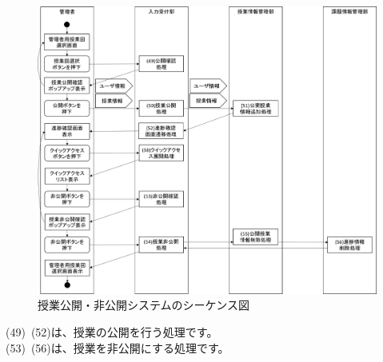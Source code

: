 \begin{figure}[htbp]
  \begin{center}
    \includegraphics[width=1\linewidth,clip]{./img/seq13.png}
    \caption{授業公開・非公開システムのシーケンス図}\label{fig:seq13}
  \end{center}
\end{figure}


(49)~(52)は、授業の公開を行う処理です。\\
(53)~(56)は、授業を非公開にする処理です。

